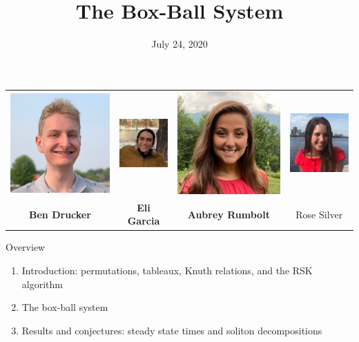 \documentclass[aspectratio=169, serif]{beamer}
\title{The Box-Ball System}
\institute{\vspace{-2em}UConn REU}
\date{\vspace{-2em}July 24, 2020}
\begin{document}
\begin{frame}
    \maketitle
      \centering
  \begin{tabular}{c c c c}
  
    \includegraphics[width=.1\linewidth]{Ben.jpeg} &     \includegraphics[width=.1\linewidth]{Eli.jpeg}  & \includegraphics[width=.1\linewidth]{Aubrey.jpeg}  &
    \includegraphics[width=.1\linewidth]{Rose.jpeg} \\
    
    \textbf{Ben Drucker} & \textbf{Eli Garcia} & \textbf{Aubrey Rumbolt} & Rose Silver \\
    \end{tabular}
    
    \centering
\end{frame}
\begin{frame}{Overview}
    \begin{enumerate}
        \item Introduction: permutations, tableaux, Knuth relations, and the RSK algorithm
        \item The box-ball system
        \item Results and conjectures: steady state times and soliton decompositions
    \end{enumerate}
\end{frame}
\end{document}
